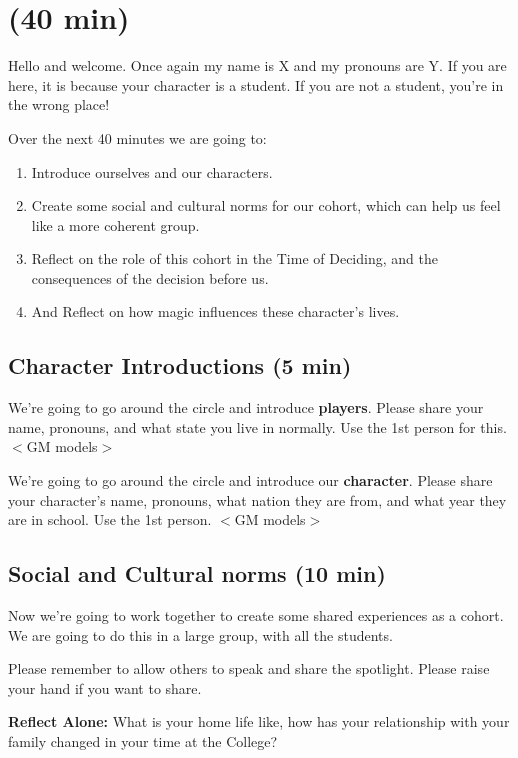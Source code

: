 \documentclass[green]{GL2020}
\begin{document}
\name{\gPreGameStudent{}}

\section*{(40 min)}

Hello and welcome. Once again my name is X and my pronouns are Y. If you are here, it is because your character is a student. If you are not a student, you're in the wrong place!

Over the next 40 minutes we are going to:
\begin{enumerate}
	\item Introduce ourselves and our characters.
	\item Create some social and cultural norms for our cohort, which can help us feel like a more coherent group.
	\item Reflect on the role of this cohort in the Time of Deciding, and the consequences of the decision before us.
	\item And Reflect on how magic influences these character’s lives.
\end{enumerate}

\subsection*{Character Introductions (5 min)}
We’re going to go around the circle and introduce \textbf{players}. Please share your name, pronouns, and what state you live in normally. Use the 1st person for this. $<$GM models$>$

We’re going to go around the circle and introduce our \textbf{character}. Please share your character’s name, pronouns, what nation they are from, and what year they are in school. Use the 1st person. $<$GM models$>$



\subsection*{Social and Cultural norms (10 min)}
Now we’re going to work together to create some shared experiences as a cohort. We are going to do this in a large group, with all the students. 

Please remember to allow others to speak and share the spotlight.  Please raise your hand if you want to share.

\textbf{Reflect Alone:} What is your home life like, how has your relationship with your family changed in your time at the College?
\end{document}

